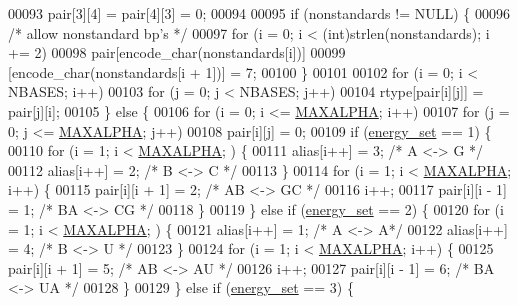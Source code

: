\begin{DoxyCode}
00093       pair[3][4] = pair[4][3] = 0;
00094 
00095     \textcolor{keywordflow}{if} (nonstandards != NULL) \{
00096       \textcolor{comment}{/* allow nonstandard bp's */}
00097       \textcolor{keywordflow}{for} (i = 0; i < (int)strlen(nonstandards); i += 2)
00098         pair[encode\_char(nonstandards[i])]
00099         [encode\_char(nonstandards[i + 1])] = 7;
00100     \}
00101 
00102     \textcolor{keywordflow}{for} (i = 0; i < NBASES; i++)
00103       \textcolor{keywordflow}{for} (j = 0; j < NBASES; j++)
00104         rtype[pair[i][j]] = pair[j][i];
00105   \} \textcolor{keywordflow}{else} \{
00106     \textcolor{keywordflow}{for} (i = 0; i <= \hyperlink{group__model__details_ga05a5ffe718aa431d97419a12fb082379}{MAXALPHA}; i++)
00107       \textcolor{keywordflow}{for} (j = 0; j <= \hyperlink{group__model__details_ga05a5ffe718aa431d97419a12fb082379}{MAXALPHA}; j++)
00108         pair[i][j] = 0;
00109     \textcolor{keywordflow}{if} (\hyperlink{group__model__details_gafb1ef1166da85092ae8a325e02dcae71}{energy\_set} == 1) \{
00110       \textcolor{keywordflow}{for} (i = 1; i < \hyperlink{group__model__details_ga05a5ffe718aa431d97419a12fb082379}{MAXALPHA}; ) \{
00111         alias[i++]  = 3;      \textcolor{comment}{/* A <-> G */}
00112         alias[i++]  = 2;      \textcolor{comment}{/* B <-> C */}
00113       \}
00114       \textcolor{keywordflow}{for} (i = 1; i < \hyperlink{group__model__details_ga05a5ffe718aa431d97419a12fb082379}{MAXALPHA}; i++) \{
00115         pair[i][i + 1] = 2;       \textcolor{comment}{/* AB <-> GC */}
00116         i++;
00117         pair[i][i - 1] = 1;       \textcolor{comment}{/* BA <-> CG */}
00118       \}
00119     \} \textcolor{keywordflow}{else} \textcolor{keywordflow}{if} (\hyperlink{group__model__details_gafb1ef1166da85092ae8a325e02dcae71}{energy\_set} == 2) \{
00120       \textcolor{keywordflow}{for} (i = 1; i < \hyperlink{group__model__details_ga05a5ffe718aa431d97419a12fb082379}{MAXALPHA}; ) \{
00121         alias[i++]  = 1;      \textcolor{comment}{/* A <-> A*/}
00122         alias[i++]  = 4;      \textcolor{comment}{/* B <-> U */}
00123       \}
00124       \textcolor{keywordflow}{for} (i = 1; i < \hyperlink{group__model__details_ga05a5ffe718aa431d97419a12fb082379}{MAXALPHA}; i++) \{
00125         pair[i][i + 1] = 5;       \textcolor{comment}{/* AB <-> AU */}
00126         i++;
00127         pair[i][i - 1] = 6;       \textcolor{comment}{/* BA <-> UA */}
00128       \}
00129     \} \textcolor{keywordflow}{else} \textcolor{keywordflow}{if} (\hyperlink{group__model__details_gafb1ef1166da85092ae8a325e02dcae71}{energy\_set} == 3) \{

\end{DoxyCode}
